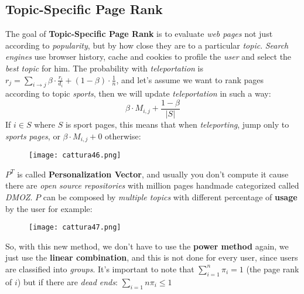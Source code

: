 \documentclass{article}
\begin{document}
\subsection{Topic-Specific Page Rank}
The goal of \textbf{Topic-Specific Page Rank} is to evaluate \emph{web pages} not just according to \emph{popularity}, but by how close they are to a particular \emph{topic}. \emph{Search engines} use browser history, cache and cookies to profile the \emph{user} and select the \emph{best topic} for him. The probability with \emph{teleportation} is $r_j = \sum_{i\rightarrow j} \beta \cdot \frac{r_i}{d_i} + (1 -\beta)\cdot \frac{1}{n}$, and let's assume we want to rank pages according to topic \emph{sports}, then we will update \emph{teleportation} in such a way:
\[\beta \cdot M_{i,j} + \frac {1-\beta}{|S|} \]
If $i \in S$ where $S$ is sport pages, this means that when \emph{teleporting}, jump only to \emph{sports pages}, or $\beta \cdot M_{i,j} + 0$ otherwise:
\begin{figure}[H]
  \centering
  \texttt{[image: cattura46.png]}
\end{figure}
$P^T$ is called \textbf{Personalization Vector}, and usually you don't compute it cause there are \emph{open source repositories} with million pages handmade categorized called \emph{DMOZ}. $P$ can be composed by \emph{multiple topics} with different percentage of \textbf{usage} by the user for example: 
\begin{figure}[H]
  \centering
  \texttt{[image: cattura47.png]}
\end{figure}
So, with this new method, we don't have to use the \textbf{power method} again, we just use the \textbf{linear combination}, and this is not done for every user, since users are classified into \emph{groups}. It's important to note that $\sum_{i=1}^{n} \pi_i = 1$ (the page rank of $i$) but if there are \emph{dead ends}: $\sum_{i=1}{n} \pi_i \leq 1$
\end{document}
